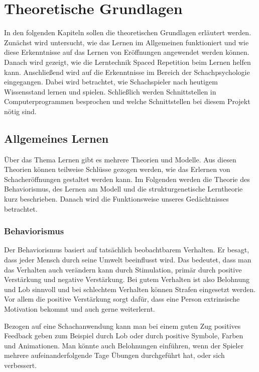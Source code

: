 
\chapter{Theoretische Grundlagen}
In den folgenden Kapiteln sollen die theoretischen Grundlagen erläutert werden. Zunächst wird untersucht, wie das Lernen im Allgemeinen funktioniert und wie diese Erkenntnisse auf das Lernen von Eröffnungen angewendet werden können. Danach wird gezeigt, wie die Lerntechnik Spaced Repetition beim Lernen helfen kann.
Anschließend wird auf die Erkenntnisse im Bereich der Schachpsychologie eingegangen. Dabei wird betrachtet, wie Schachspieler nach heutigem Wissensstand lernen und spielen. Schließlich werden Schnittstellen in Computerprogrammen besprochen und welche Schnittstellen bei diesem Projekt nötig sind.

\section{Allgemeines Lernen}
Über das Thema Lernen gibt es mehrere Theorien und Modelle. Aus diesen Theorien können teilweise Schlüsse gezogen werden, wie das Erlernen von Schacheröffnungen gestaltet werden kann.
Im Folgenden werden die Theorie des Behaviorismus, des Lernen am Modell und die strukturgenetische Lerntheorie kurz beschrieben.
Danach wird die Funktionsweise unseres Gedächtnisses betrachtet.

\subsection{Behaviorismus}
Der Behaviorismus basiert auf tatsächlich beobachtbarem Verhalten. Er besagt, dass jeder Mensch durch seine Umwelt beeinflusst wird. Das bedeutet, dass man das Verhalten auch verändern kann durch Stimulation, primär durch positive Verstärkung und negative Verstärkung. Bei gutem Verhalten ist also Belohnung und Lob sinnvoll und bei schlechtem Verhalten können Strafen eingesetzt werden. Vor allem die positive Verstärkung sorgt dafür, dass eine Person extrinsische Motivation bekommt und auch gerne weiterlernt.
\cite{kron_grundwissen_2024}

Bezogen auf eine Schachanwendung kann man bei einem guten Zug positives Feedback geben zum Beispiel durch Lob oder durch positive Symbole, Farben und Animationen. Man könnte auch Belohnungen einführen, wenn der Spieler mehrere aufeinanderfolgende Tage Übungen durchgeführt hat, oder sich verbessert.

